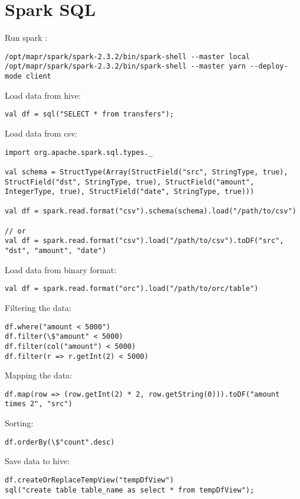 \documentclass{article}
\begin{document}
\section*{Spark SQL}

Run spark :
\begin{lstlisting}[]
/opt/mapr/spark/spark-2.3.2/bin/spark-shell --master local
/opt/mapr/spark/spark-2.3.2/bin/spark-shell --master yarn --deploy-mode client
\end{lstlisting}

Load data from hive:
\begin{lstlisting}[]
val df = sql("SELECT * from transfers");
\end{lstlisting}

Load data from csv:
\begin{lstlisting}[]
import org.apache.spark.sql.types._

val schema = StructType(Array(StructField("src", StringType, true), StructField("dst", StringType, true), StructField("amount", IntegerType, true), StructField("date", StringType, true)))

val df = spark.read.format("csv").schema(schema).load("/path/to/csv")

// or
val df = spark.read.format("csv").load("/path/to/csv").toDF("src", "dst", "amount", "date")
\end{lstlisting}

Load data from binary format:
\begin{lstlisting}[]
val df = spark.read.format("orc").load("/path/to/orc/table")
\end{lstlisting}

Filtering the data:
\begin{lstlisting}[]
df.where("amount < 5000")
df.filter(\$"amount" < 5000)
df.filter(col("amount") < 5000)
df.filter(r => r.getInt(2) < 5000)
\end{lstlisting}

Mapping the data:
\begin{lstlisting}[]
df.map(row => (row.getInt(2) * 2, row.getString(0))).toDF("amount times 2", "src")
\end{lstlisting}

Sorting:
\begin{lstlisting}[]
df.orderBy(\$"count".desc)
\end{lstlisting}

Save data to hive:
\begin{lstlisting}[]
df.createOrReplaceTempView("tempDfView")
sql("create table table_name as select * from tempDfView");
\end{lstlisting}
\end{document}
